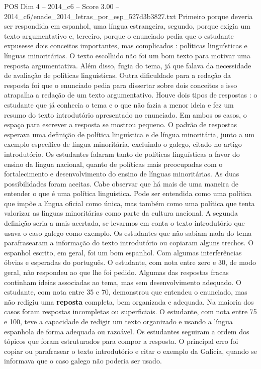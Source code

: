 \begin{textsample}{POS Dim 4 – 2014\_c6 – Score 3.00 – 2014\_c6/enade\_2014\_letras\_por\_esp\_527d3b3827.txt}
Primeiro porque deveria ser respondida em espanhol, uma língua estrangeira, segundo, porque exigia um texto argumentativo e, terceiro, porque o enunciado pedia que o estudante expusesse dois conceitos importantes, mas complicados : políticas linguísticas e línguas minoritárias.
O texto escolhido não foi um bom texto para motivar uma resposta argumentativa.
Além disso, fugia do tema, já que falava da necessidade de avaliação de políticas linguísticas.
Outra dificuldade para a redação da resposta foi que o enunciado pedia para dissertar sobre dois conceitos e isso atrapalha a redação de um texto argumentativo.
Houve dois tipos de respostas : o estudante que já conhecia o tema e o que não fazia a menor ideia e fez um resumo do texto introdutório apresentado no enunciado.
Em ambos os casos, o espaço para escrever a resposta se mostrou pequeno.
O padrão de respostas esperava uma definição de política linguística e de língua minoritária, junto a um exemplo específico de língua minoritária, excluindo o galego, citado no artigo introdutório.
Os estudantes falaram tanto de políticas linguísticas a favor do ensino da língua nacional, quanto de políticas mais preocupadas com o fortalecimento e desenvolvimento do ensino de línguas minoritárias.
As duas possibilidades foram aceitas.
Cabe observar que há mais de uma maneira de entender o que é uma política linguística.
Pode ser entendida como uma política que impõe a língua oficial como única, mas também como uma política que tenta valorizar as línguas minoritárias como parte da cultura nacional.
A segunda definição seria a mais acertada, se levarmos em conta o texto introdutório que usava o caso galego como exemplo.
Os estudantes que não sabiam nada do tema parafrasearam a informação do texto introdutório ou copiaram alguns trechos.
O espanhol escrito, em geral, foi um bom espanhol.
Com algumas interferências óbvias e esperadas do português.
O estudante, com nota entre zero e 30, de modo geral, não respondeu ao que lhe foi pedido.
Algumas das respostas fracas continham ideias associadas ao tema, mas sem desenvolvimento adequado.
O estudante, com nota entre 35 e 70, demonstrou que entendeu o enunciado, mas não redigiu uma \textbf{reposta} completa, bem organizada e adequada.
Na maioria dos casos foram respostas incompletas ou superficiais.
O estudante, com nota entre 75 e 100, teve a capacidade de redigir um texto organizado e usando a língua espanhola de forma adequada ou razoável.
Os estudantes seguiram a ordem dos tópicos que foram estruturados para compor a resposta.
O principal erro foi copiar ou parafrasear o texto introdutório e citar o exemplo da Galícia, quando se informava que o caso galego não poderia ser usado.

\end{textsample}
